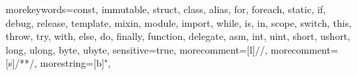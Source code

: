 {
	morekeywords={const, immutable, struct, class, alias, for, foreach, static, if, debug, release, template, mixin, module, import, while, is, in, scope, switch, this, throw, try, with, else, do, finally, function, delegate, asm, int, uint, short, ushort, long, ulong, byte, ubyte},
	sensitive=true,
	morecomment=[l]{//},
	morecomment=[s]{/*}{*/},
	morestring=[b]",
}

